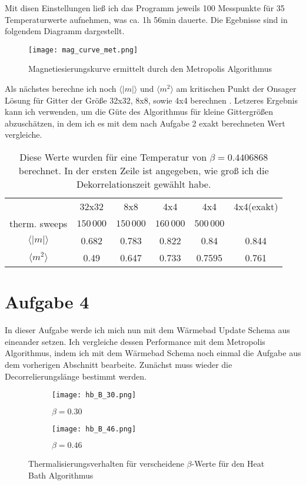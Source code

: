 \documentclass[12pt]{article}
\begin{document}
Mit disen  Einstellungen ließ ich das Programm jeweils 100 Messpunkte für 35 Temperaturwerte aufnehmen, was ca. 1h 56min dauerte. Die Egebnisse sind in folgendem Diagramm dargestellt.

\begin{figure}[H]\centering\texttt{[image: mag\_curve\_met.png]}\caption{Magnetiesierungskurve ermittelt durch den Metropolis Algorithmus}\end{figure}

Als nächstes berechne ich noch $\langle |m| \rangle$ und $\langle m^2 \rangle$ am kritischen Punkt der Onsager Lösung für Gitter der Größe 32x32, 8x8, sowie 4x4 berechnen . Letzeres Ergebnis kann ich verwenden, um die Güte des Algorithmus für kleine Gittergrößen abzuschätzen, in dem ich es mit dem nach Aufgabe 2 exakt berechneten Wert vergleiche.
\begin{table}[H]\centering\begin{tabular}{c|c|c|c|c|c}&32x32&8x8&4x4&4x4&4x4(exakt)\\
    therm. sweeps&$150\,000$&$150\,000$&$160\,000$&$500\,000$&\\
    $\langle |m| \rangle$&0.682&0.783&0.822&0.84&0.844\\
    $\langle m^2 \rangle$&0.49&0.647&0.733&0.7595&0.761
\end{tabular}\caption{Diese Werte wurden für eine Temperatur von $\beta=0.4406868$ berechnet. In der ersten Zeile ist angegeben, wie groß ich die Dekorrelationszeit gewählt habe.}\end{table}


\section*{Aufgabe 4}
In dieser Aufgabe werde ich mich nun mit dem Wärmebad Update Schema aus eineander setzen. Ich vergleiche dessen Performance mit dem Metropolis Algorithmus, indem ich mit dem Wärmebad Schema noch einmal die Aufgabe aus dem vorherigen Abschnitt bearbeite. Zunächst muss wieder die Decorrelierungslänge bestimmt werden.
\begin{figure}[H]\hspace*{-1.5cm}
    \begin{subfigure}{0.4\textwidth}
    \texttt{[image: hb\_B\_30.png]}
    \caption{$\beta=0.30$}
    \end{subfigure}
    \hfill
    \begin{subfigure}{0.4\textwidth}
    \hspace*{-0.8cm}
    \texttt{[image: hb\_B\_46.png]}
    \caption{$\beta=0.46$}
    \end{subfigure}
    \hfill
\caption{Thermalisierungsverhalten für verscheidene $\beta$-Werte für den Heat Bath Algorithmus}
\end{figure}
\end{document}
